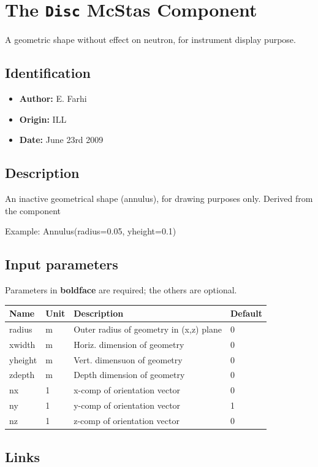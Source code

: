 \section{The \texttt{Disc} McStas Component}
A geometric shape without effect on neutron, for instrument display purpose.

\subsection*{Identification}
\begin{itemize}
  \item \textbf{Author:} E. Farhi
  \item \textbf{Origin:} ILL
  \item \textbf{Date:} June 23rd 2009
\end{itemize}

\subsection*{Description}
An inactive geometrical shape (annulus), for drawing purposes only. Derived from the \textbf{} component

Example: Annulus(radius=0.05, yheight=0.1)

\subsection*{Input parameters}
Parameters in \textbf{boldface} are required; the others are optional.

\begin{longtable}{p{}p{}p{}p{}}
\toprule
\textbf{Name} & \textbf{Unit} & \textbf{Description} & \textbf{Default} \\
\midrule
\endhead
radius & m & Outer radius of geometry in (x,z) plane & 0 \\
xwidth & m & Horiz. dimension of geometry & 0 \\
yheight & m & Vert. dimensuon of geometry & 0 \\
zdepth & m & Depth dimension of geometry & 0 \\
nx & 1 & x-comp of orientation vector & 0 \\
ny & 1 & y-comp of orientation vector & 1 \\
nz & 1 & z-comp of orientation vector & 0 \\
\bottomrule
\end{longtable}

\subsection*{Links}
\begin{itemize}
  \item Component source code found in file \texttt{Disc.comp}.
  \item mcdoc page of } component
\end{itemize}
